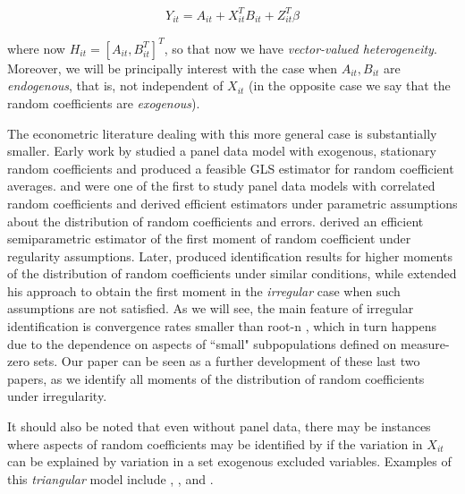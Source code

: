 \begin{align}
  Y_{it} = A_{it} + X_{it}^T B_{it} + Z_{it}^T \beta
\end{align}

\noindent where now  $H_{it} = [A_{it}, B_{it}^T]^T$, so that now we have \emph{vector-valued heterogeneity}. Moreover, we will be principally interest with the case when $A_{it}, B_{it}$ are \emph{endogenous}, that is, not independent of $X_{it}$ (in the opposite case we say that the random coefficients are \emph{exogenous}).

The econometric literature dealing with this more general case is substantially smaller. Early work by \cite{swamy1970efficient} studied a panel data model with exogenous, stationary random coefficients and produced a feasible GLS estimator for random coefficient averages. \cite{mundlak1978models} and \cite{chamberlain1984panel} were one of the first to study panel data models with correlated random coefficients and derived efficient estimators under parametric assumptions about the distribution of random coefficients and errors. \cite{chamberlain1992efficiency} derived an efficient semiparametric estimator of the first moment of random coefficient under regularity assumptions. Later, \cite{arellano2011identifying} produced identification results for higher moments of the distribution of random coefficients under similar conditions, while \cite{graham2012identification} extended his approach to obtain the first moment in the \emph{irregular} case when such assumptions are not satisfied. As we will see, the main feature of irregular identification is convergence rates smaller than root-n \citep{lewbel2016identification}, which in turn happens due to the dependence on aspects of ``small" subpopulations defined on measure-zero sets. Our paper can be seen as a further development of these last two papers, as we identify all moments of the distribution of random coefficients under irregularity.

It should also be noted that even without panel data, there may be instances where aspects of random coefficients may be identified by if the variation in $X_{it}$ can be explained by variation in a set exogenous excluded variables. Examples of this \emph{triangular} model include \cite{heckman1998instrumental}, \cite{hoderlein2010analyzing}, and \cite{hoderlein2017triangular}.

